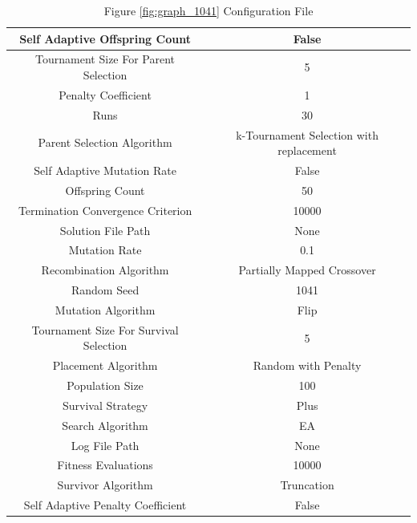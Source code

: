 \documentclass{standalone}
\begin{document}
\clearpage
\begin{table}[!htb]
	\centering
	\caption{Figure \ref{fig:graph_1041} Configuration File}
	\label{tab:graph_1041}
	\begin{tabular}{| c | c |}
		\hline
		Self Adaptive Offspring Count		& False		 \\
		\hline
		Tournament Size For Parent Selection		& 5		 \\
		\hline
		Penalty Coefficient		& 1		 \\
		\hline
		Runs		& 30		 \\
		\hline
		Parent Selection Algorithm		& k-Tournament Selection with replacement		 \\
		\hline
		Self Adaptive Mutation Rate		& False		 \\
		\hline
		Offspring Count		& 50		 \\
		\hline
		Termination Convergence Criterion		& 10000		 \\
		\hline
		Solution File Path		& None		 \\
		\hline
		Mutation Rate		& 0.1		 \\
		\hline
		Recombination Algorithm		& Partially Mapped Crossover		 \\
		\hline
		Random Seed		& 1041		 \\
		\hline
		Mutation Algorithm		& Flip		 \\
		\hline
		Tournament Size For Survival Selection		& 5		 \\
		\hline
		Placement Algorithm		& Random with Penalty		 \\
		\hline
		Population Size		& 100		 \\
		\hline
		Survival Strategy		& Plus		 \\
		\hline
		Search Algorithm		& EA		 \\
		\hline
		Log File Path		& None		 \\
		\hline
		Fitness Evaluations		& 10000		 \\
		\hline
		Survivor Algorithm		& Truncation		 \\
		\hline
		Self Adaptive Penalty Coefficient		& False		 \\
		\hline
	\end{tabular}
\end{table}
\end{document}
